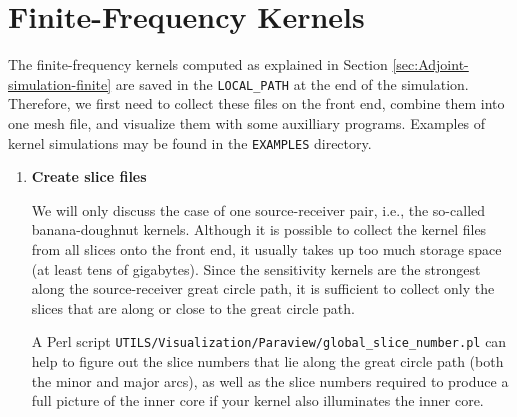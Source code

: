 \documentclass[oneside,english]{book}
\newenvironment{lyxcode}
{\begin{list}{}{
\setlength{\rightmargin}{\leftmargin}
\setlength{\listparindent}{0pt}%
\raggedright
\setlength{\itemsep}{0pt}
\setlength{\parsep}{0pt}
\normalfont\ttfamily}%
 \item[]}
{\end{list}}
\begin{document}
\section{\label{sec:Finite-Frequency-Kernels}Finite-Frequency Kernels}

The finite-frequency kernels computed as explained in Section \ref{sec:Adjoint-simulation-finite}
are saved in the \texttt{LOCAL\_PATH} at the end of the simulation.
Therefore, we first need to collect these files on the front end,
combine them into one mesh file, and visualize them with some auxilliary
programs. Examples of kernel simulations may be found in the \texttt{EXAMPLES} directory.

\begin{enumerate}
\item \textbf{Create slice files}


We will only discuss the case of one source-receiver pair, i.e., the
so-called banana-doughnut kernels. Although it is possible to collect
the kernel files from all slices onto the front end, it usually takes
up too much storage space (at least tens of gigabytes). Since the
sensitivity kernels are the strongest along the source-receiver great
circle path, it is sufficient to collect only the slices that are
along or close to the great circle path.

A Perl script \texttt{UTILS/Visualization/Paraview/global\_slice\_number.pl} can
help to figure out the slice numbers that lie along the great circle
path (both the minor and major arcs), as well as the slice numbers
required to produce a full picture of the inner core if your kernel
also illuminates the inner core.

\end{enumerate}
\end{document}
